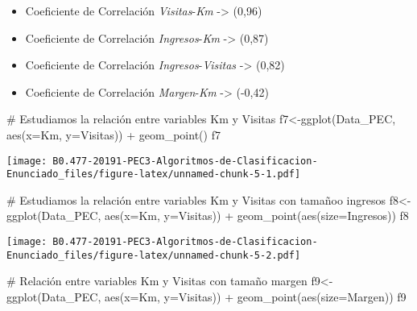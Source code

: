 \documentclass[]{article}
\newenvironment{Shaded}{\begin{snugshade}}{\end{snugshade}}
\newcommand{\KeywordTok}[1]{\textcolor[rgb]{0.94,0.87,0.69}{#1}}
\newcommand{\DataTypeTok}[1]{\textcolor[rgb]{0.87,0.87,0.75}{#1}}
\newcommand{\StringTok}[1]{\textcolor[rgb]{0.80,0.58,0.58}{#1}}
\newcommand{\CommentTok}[1]{\textcolor[rgb]{0.50,0.62,0.50}{#1}}
\newcommand{\OperatorTok}[1]{\textcolor[rgb]{0.94,0.94,0.82}{#1}}
\newcommand{\NormalTok}[1]{\textcolor[rgb]{0.80,0.80,0.80}{#1}}
\begin{document}
\begin{itemize}
\item
  Coeficiente de Correlación \emph{Visitas}-\emph{Km} -\textgreater{}
  (0,96)
\item
  Coeficiente de Correlación \emph{Ingresos}-\emph{Km} -\textgreater{}
  (0,87)
\item
  Coeficiente de Correlación \emph{Ingresos}-\emph{Visitas}
  -\textgreater{} (0,82)
\item
  Coeficiente de Correlación \emph{Margen}-\emph{Km} -\textgreater{}
  (-0,42)
\end{itemize}

\begin{Shaded}
\begin{Highlighting}[]
\CommentTok{# Estudiamos la relación entre variables Km y Visitas}
\NormalTok{f7<-}\KeywordTok{ggplot}\NormalTok{(Data_PEC, }\KeywordTok{aes}\NormalTok{(}\DataTypeTok{x=}\NormalTok{Km, }\DataTypeTok{y=}\NormalTok{Visitas)) }\OperatorTok{+}\StringTok{ }\KeywordTok{geom_point}\NormalTok{()}
\NormalTok{f7}
\end{Highlighting}
\end{Shaded}

\texttt{[image: B0.477-20191-PEC3-Algoritmos-de-Clasificacion-Enunciado\_files/figure-latex/unnamed-chunk-5-1.pdf]}

\begin{Shaded}
\begin{Highlighting}[]
\CommentTok{# Estudiamos la relación entre variables Km y Visitas con tamañoo ingresos}
\NormalTok{f8<-}\KeywordTok{ggplot}\NormalTok{(Data_PEC, }\KeywordTok{aes}\NormalTok{(}\DataTypeTok{x=}\NormalTok{Km, }\DataTypeTok{y=}\NormalTok{Visitas)) }\OperatorTok{+}\StringTok{ }\KeywordTok{geom_point}\NormalTok{(}\KeywordTok{aes}\NormalTok{(}\DataTypeTok{size=}\NormalTok{Ingresos))}
\NormalTok{f8}
\end{Highlighting}
\end{Shaded}

\texttt{[image: B0.477-20191-PEC3-Algoritmos-de-Clasificacion-Enunciado\_files/figure-latex/unnamed-chunk-5-2.pdf]}

\begin{Shaded}
\begin{Highlighting}[]
\CommentTok{# Relación entre variables Km y Visitas con tamaño margen}
\NormalTok{f9<-}\KeywordTok{ggplot}\NormalTok{(Data_PEC, }\KeywordTok{aes}\NormalTok{(}\DataTypeTok{x=}\NormalTok{Km, }\DataTypeTok{y=}\NormalTok{Visitas)) }\OperatorTok{+}\StringTok{ }\KeywordTok{geom_point}\NormalTok{(}\KeywordTok{aes}\NormalTok{(}\DataTypeTok{size=}\NormalTok{Margen))}
\NormalTok{f9}
\end{Highlighting}
\end{Shaded}
\end{document}

